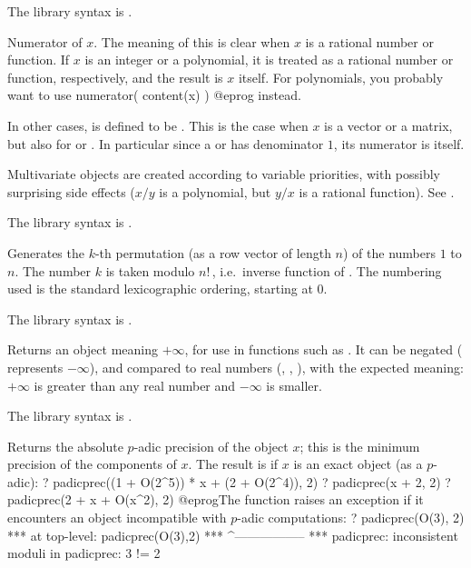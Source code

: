 The library syntax is .

\label{se:numerator}
Numerator of $x$. The meaning of this
is clear when $x$ is a rational number or function. If $x$ is an integer
or a polynomial, it is treated as a rational number or function,
respectively, and the result is $x$ itself. For polynomials, you
probably want to use
\bprog
numerator( content(x) )
@eprog\noindent
instead.

In other cases,  is defined to be
. This is the case when $x$ is a vector or a
matrix, but also for  or . In particular since a
 or  has  denominator $1$, its numerator is
itself.

 Multivariate objects are created according to variable
priorities, with possibly surprising side effects ($x/y$ is a polynomial, but
$y/x$ is a rational function). See .

The library syntax is .

\label{se:numtoperm}
Generates the $k$-th permutation (as a row vector of length $n$) of the
numbers $1$ to $n$. The number $k$ is taken modulo $n!\,$, i.e.~inverse
function of . The numbering used is the standard lexicographic
ordering, starting at $0$.

The library syntax is .

\label{se:oo}
Returns an object meaning $+\infty$, for use in functions such as
. It can be negated ( represents $-\infty$), and
compared to real numbers (, , ), with the
expected meaning: $+\infty$ is greater than any real number and $-\infty$ is
smaller.

The library syntax is .

\label{se:padicprec}
Returns the absolute $p$-adic precision of the object $x$; this is the
minimum precision of the components of $x$. The result is  if $x$
is an exact object (as a $p$-adic):
\bprog
? padicprec((1 + O(2^5)) * x + (2 + O(2^4)), 2)
? padicprec(x + 2, 2)
? padicprec(2 + x + O(x^2), 2)
@eprog\noindent The function raises an exception if it encounters
an object incompatible with $p$-adic computations:
\bprog
? padicprec(O(3), 2)
 ***   at top-level: padicprec(O(3),2)
 ***                 ^-----------------
 *** padicprec: inconsistent moduli in padicprec: 3 != 2

